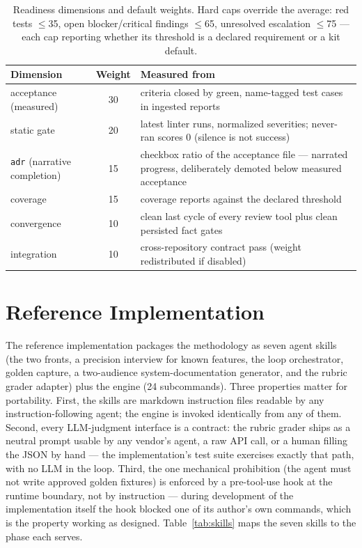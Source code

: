 \documentclass[11pt]{article}
\begin{document}
\begin{table}[t]
\centering
\small
\begin{tabular}{@{}lcp{8.6cm}@{}}
\toprule
\textbf{Dimension} & \textbf{Weight} & \textbf{Measured from} \\
\midrule
acceptance (measured) & 30 & criteria closed by green, name-tagged test cases
in ingested reports \\
static gate & 20 & latest linter runs, normalized severities; never-ran scores
0 (silence is not success) \\
\texttt{adr} (narrative completion) & 15 & checkbox ratio of the acceptance
file --- narrated progress, deliberately demoted below measured acceptance \\
coverage & 15 & coverage reports against the declared threshold \\
convergence & 10 & clean last cycle of every review tool plus clean persisted
fact gates \\
integration & 10 & cross-repository contract pass (weight redistributed if
disabled) \\
\bottomrule
\end{tabular}
\caption{Readiness dimensions and default weights. Hard caps override the
average: red tests $\le$35, open blocker/critical findings $\le$65, unresolved
escalation $\le$75 --- each cap reporting whether its threshold is a declared
requirement or a kit default.}
\label{tab:readiness}
\end{table}

\section{Reference Implementation}\label{sec:impl}

The reference implementation packages the methodology as seven agent skills
(the two fronts, a precision interview for known features, the loop
orchestrator, golden capture, a two-audience system-documentation generator,
and the rubric grader adapter) plus the engine (24 subcommands). Three
properties matter for portability. First, the skills are markdown instruction
files readable by any instruction-following agent; the engine is invoked
identically from any of them. Second, every LLM-judgment interface is a
contract: the rubric grader ships as a neutral prompt usable by any vendor's
agent, a raw API call, or a human filling the JSON by hand --- the
implementation's test suite exercises exactly that path, with no LLM in the
loop. Third, the one mechanical prohibition (the agent must not write approved
golden fixtures) is enforced by a pre-tool-use hook at the runtime boundary,
not by instruction --- during development of the implementation itself the hook
blocked one of its author's own commands, which is the property working as
designed. Table~\ref{tab:skills} maps the seven skills to the phase each serves.
\end{document}
